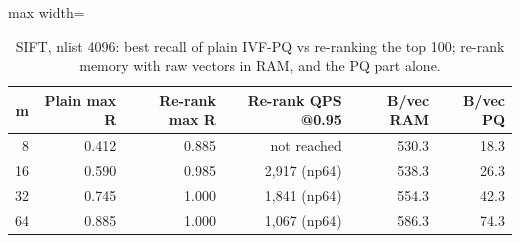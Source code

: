 \begin{table}[!t]
\centering
\footnotesize
\begin{adjustbox}{max width=\linewidth}
\begin{tabular}{rrrrrr}
\toprule
m & Plain max R & Re-rank max R & Re-rank QPS @0.95 & B/vec RAM & B/vec PQ \\
\midrule
8 & 0.412 & 0.885 & not reached & 530.3 & 18.3 \\
16 & 0.590 & 0.985 & 2,917 (np64) & 538.3 & 26.3 \\
32 & 0.745 & 1.000 & 1,841 (np64) & 554.3 & 42.3 \\
64 & 0.885 & 1.000 & 1,067 (np64) & 586.3 & 74.3 \\
\bottomrule
\end{tabular}
\end{adjustbox}
\caption{SIFT, nlist 4096: best recall of plain IVF-PQ vs re-ranking the top 100; re-rank memory with raw vectors in RAM, and the PQ part alone.}
\label{tab:part3c}
\end{table}
